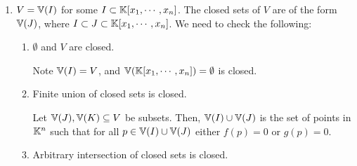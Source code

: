 \documentclass[Notebook.tex]{subfiles}
\begin{document}
\begin{solution}
    \bbni
    \begin{enumerate}[label=(\alph*),ref=\theenumi\alph*]
        \item $V = \mathbb V(I)$ for some $I \subset \mathbb K[x_1, \cdots, x_n]$. The closed sets of $V$ are of the form $\mathbb V(J)$, where $I \subset J \subset \mathbb K[x_1, \cdots, x_n]$. We need to check the following: 
        \begin{enumerate}[label=(\roman*),ref=\theenumi\roman*]
        \item $\emptyset$ and $V$ are closed. 
        
        Note $\mathbb V(I) = V$, and $\mathbb V(\mathbb K[x_1, \cdots, x_n]) = \emptyset$ is closed. 

        \item Finite union of closed sets is closed.
        
        Let $\mathbb V(J), \mathbb V(K) \subseteq V$ be subsets. Then, $\mathbb V(I) \cup \mathbb V(J)$ is the set of points in $\mathbb K^n$ such that for all $p \in \mathbb V(I) \cup \mathbb V(J)$ either $f(p) = 0$ or $g(p) = 0$. 
        \item Arbitrary intersection of closed sets is closed. 
    \end{enumerate}
    \end{enumerate}
\end{solution}



\end{document}
